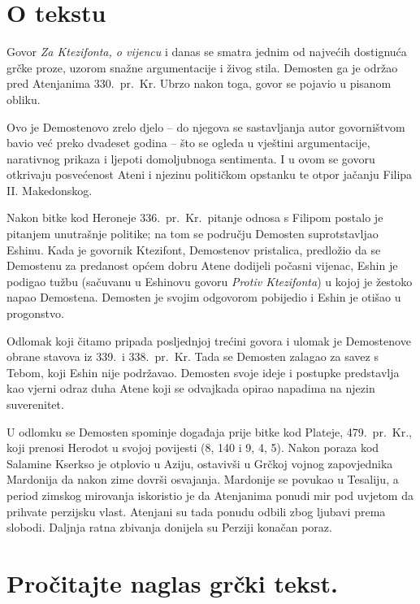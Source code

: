 
\section*{O tekstu}

Govor \textit{Za Ktezifonta, o vijencu} i danas se smatra jednim od najvećih dostignuća grčke proze, uzorom snažne argumentacije i živog stila. Demosten ga je održao pred Atenjanima 330.\ pr.~Kr. Ubrzo nakon toga, govor se pojavio u pisanom obliku.

Ovo je Demostenovo zrelo djelo – do njegova se sastavljanja autor govorništvom bavio već preko dvadeset godina – što se ogleda u vještini argumentacije, narativnog prikaza i ljepoti domoljubnoga sentimenta. I u ovom se govoru otkrivaju posvećenost Ateni i njezinu političkom opstanku te otpor jačanju Filipa II. Makedonskog. 

Nakon bitke kod Heroneje 336.\ pr.~Kr.\ pitanje odnosa s Filipom postalo je pitanjem unutrašnje politike; na tom se području Demosten suprotstavljao Eshinu. Kada je govornik Ktezifont, Demostenov pristalica, predložio da se Demostenu za predanost općem dobru Atene dodijeli počasni vijenac, Eshin je podigao tužbu (sačuvanu u Eshinovu govoru \textit{Protiv Ktezifonta}) u kojoj je žestoko napao Demostena. Demosten je svojim odgovorom pobijedio i Eshin je otišao u progonstvo.

Odlomak koji čitamo pripada posljednjoj trećini govora i ulomak je Demostenove obrane stavova iz 339.\ i 338.\ pr.~Kr. Tada se Demosten zalagao za savez s Tebom, koji Eshin nije podržavao. Demosten svoje ideje i postupke predstavlja kao vjerni odraz duha Atene koji se odvajkada opirao napadima na njezin suverenitet.

U odlomku se Demosten spominje događaja prije bitke kod Plateje, 479.\ pr.~Kr., koji prenosi Herodot u svojoj povijesti (8, 140 i 9, 4, 5). Nakon poraza kod Salamine Kserkso je otplovio u Aziju, ostavivši u Grčkoj vojnog zapovjednika Mardonija da nakon zime dovrši osvajanja. Mardonije se povukao u Tesaliju, a period zimskog mirovanja iskoristio je da Atenjanima ponudi mir pod uvjetom da prihvate perzijsku vlast. Atenjani su tada ponudu odbili zbog ljubavi prema slobodi. Daljnja ratna zbivanja donijela su Perziji konačan poraz.


\section*{Pročitajte naglas grčki tekst.}

